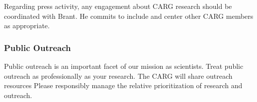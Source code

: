 \documentclass[fleqn,10pt]{wlscirep}
\begin{document}
Regarding press activity,
any engagement about
CARG research should be
coordinated with Brant.
He commits to include
and center other CARG 
members as appropriate.

\subsubsection{Public Outreach}
\label{sec:public_outreach}

Public outreach is an
important facet of our
mission as scientists.
Treat public outreach
as professionally as
your research. The
CARG will share
outreach resources
Please responsibly manage
the relative prioritization
of
research and outreach.







\end{document}

